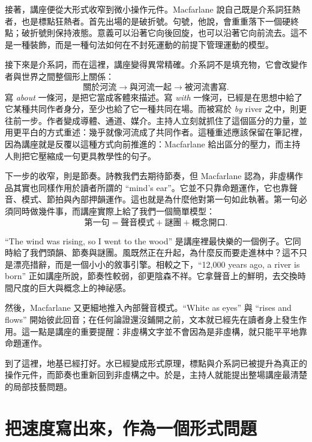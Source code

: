 接著，講座便從大形式收窄到微小操作元件。Macfarlane 說自己既是介系詞狂熱者，也是標點狂熱者。首先出場的是破折號。句號，他說，會重重落下一個硬終點；破折號則保持液態。意義可以沿著它向後回旋，也可以沿著它向前流去。這不是一種裝飾，而是一種句法如何在不封死運動的前提下管理運動的模型。

接下來是介系詞，而在這裡，講座變得異常精確。介系詞不是填充物，它會改變作者與世界之間整個形上關係：
\begin{equation}
\text{關於河流} \longrightarrow \text{與河流一起} \longrightarrow \text{被河流書寫}.
\end{equation}
寫 \emph{about} 一條河，是把它當成客體來描述。寫 \emph{with} 一條河，已經是在思想中給了它某種共同作者身分，至少也給了它一種共同在場。而被寫於 \emph{by} river 之中，則更往前一步。作者變成導體、通道、媒介。主持人立刻就抓住了這個區分的力量，並用更平白的方式重述：幾乎就像河流成了共同作者。這種重述應該保留在筆記裡，因為講座就是反覆以這種方式向前推進的：Macfarlane 給出區分的壓力，而主持人則把它壓縮成一句更具教學性的句子。

下一步的收窄，則是節奏。詩教我們去期待節奏，但 Macfarlane 認為，非虛構作品其實也同樣作用於讀者所謂的 ``mind's ear''。它並不只靠命題運作，它也靠聲音、模式、節拍與內部押韻運作。這也就是為什麼他對第一句如此執著。第一句必須同時做幾件事，而講座實際上給了我們一個簡單模型：
\begin{equation}
\text{第一句} = \text{聲音模式} + \text{謎團} + \text{概念開口}.
\end{equation}

``The wind was rising, so I went to the wood'' 是講座裡最快樂的一個例子。它同時給了我們頭韻、節奏與謎團。風既然正在升起，為什麼反而要走進林中？這不只是漂亮措辭，而是一個小小的敘事引擎。相較之下，``12{,}000 years ago, a river is born'' 正如講座所說，節奏性較弱，卻更陰森不祥。它拿聲音上的鮮明，去交換時間尺度的巨大與概念上的神祕感。

然後，Macfarlane 又更細地推入內部聲音模式。``White as eyes'' 與 ``rises and flows'' 開始彼此回音；在任何論證還沒鋪開之前，文本就已經先在讀者身上發生作用。這一點是講座的重要提醒：非虛構文字並不會因為是非虛構，就只能平平地靠命題運作。

到了這裡，地基已經打好。水已經變成形式原理，標點與介系詞已被提升為真正的操作元件，而節奏也重新回到非虛構之中。於是，主持人就能提出整場講座最清楚的局部技藝問題。

\section{把速度寫出來，作為一個形式問題}

